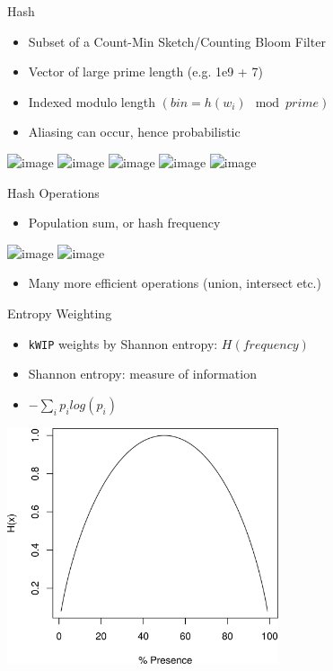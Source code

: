 \documentclass[t]{beamer}
\begin{document}
\begin{frame}{Hash}
  \begin{itemize}
    \item Subset of a Count-Min Sketch/Counting Bloom Filter
    \item Vector of large prime length (e.g. 1e9 + 7)
    \item Indexed modulo length $(bin = h(w_i) \mod prime)$
    \item Aliasing can occur, hence probabilistic
  \end{itemize}
  \begin{center}
    \includegraphics<1>[width=0.6\textwidth]{img/hash-0.png}
    \includegraphics<2>[width=0.6\textwidth]{img/hash-1.png}
    \includegraphics<3>[width=0.6\textwidth]{img/hash-2.png}
    \includegraphics<4>[width=0.6\textwidth]{img/hash-3.png}
    \includegraphics<5>[width=0.6\textwidth]{img/hash-4.png}
  \end{center}
\end{frame}


\begin{frame}{Hash Operations}
  \begin{itemize}
    \item Population sum, or hash frequency
  \end{itemize}
  \begin{center}
    \includegraphics<1>[width=0.6\textwidth]{img/hash-sums.png}
    \includegraphics<2>[width=0.6\textwidth]{img/hash-sumfreq.png}
  \end{center}
  \begin{itemize}
    \item<2-> Many more efficient operations \small{(union, intersect etc.)}
  \end{itemize}
\end{frame}

\begin{frame}{Entropy Weighting}
  \begin{itemize}
    \item \texttt{kWIP} weights by Shannon entropy: $H(frequency)$
    \item Shannon entropy: measure of information
    \item $ -\sum\limits_{i} p_i log(p_i) $
  \end{itemize}
  \begin{center}
    \includegraphics[width=0.6\textwidth]{img/shanent.png}
  \end{center}
\end{frame}
\end{document}
